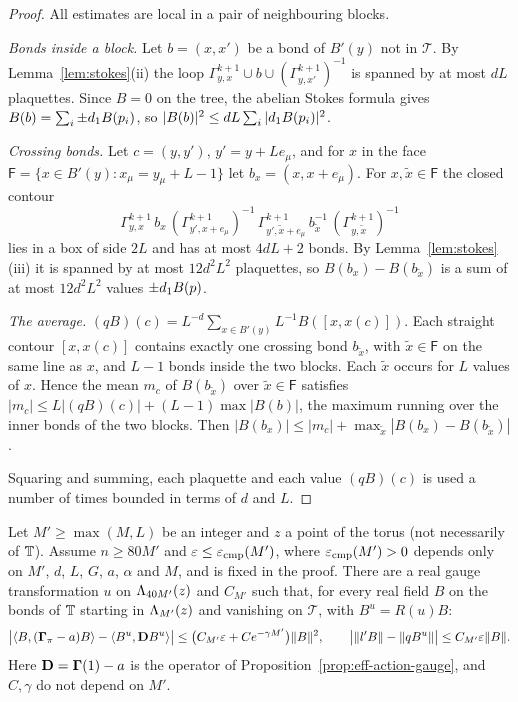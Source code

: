 \begin{proof}
All estimates are local in a pair of neighbouring blocks.

\emph{Bonds inside a block.} Let $b=(x,x')$ be a bond of $B'(y)$ not in $\mathcal T$. By Lemma~\ref{lem:stokes}(ii) the loop $\Gamma^{k+1}_{y,x}\cup b\cup(\Gamma^{k+1}_{y,x'})^{-1}$ is spanned by at most $dL$ plaquettes. Since $B=0$ on the tree, the abelian Stokes formula gives $B(b)=\sum_i\pm d_1 B(p_i)$, so $|B(b)|^2\le dL\sum_i|d_1 B(p_i)|^2$.

\emph{Crossing bonds.} Let $c=(y,y')$, $y'=y+Le_\mu$, and for $x$ in the face $\mathsf F=\{x\in B'(y):x_\mu=y_\mu+L-1\}$ let $b_x=(x,x+e_\mu)$. For $x,\tilde x\in\mathsf F$ the closed contour
\[
\Gamma^{k+1}_{y,x}\,b_x\,(\Gamma^{k+1}_{y',x+e_\mu})^{-1}\,\Gamma^{k+1}_{y',\tilde x+e_\mu}\,b_{\tilde x}^{-1}\,(\Gamma^{k+1}_{y,\tilde x})^{-1}
\]
lies in a box of side $2L$ and has at most $4dL+2$ bonds. By Lemma~\ref{lem:stokes}(iii) it is spanned by at most $12d^2L^2$ plaquettes, so $B(b_x)-B(b_{\tilde x})$ is a sum of at most $12d^2L^2$ values $\pm d_1 B(p)$.

\emph{The average.} $(qB)(c)=L^{-d}\sum_{x\in B'(y)}L^{-1}B([x,x(c)])$. Each straight contour $[x,x(c)]$ contains exactly one crossing bond $b_{\tilde x}$, with $\tilde x\in\mathsf F$ on the same line as $x$, and $L-1$ bonds inside the two blocks. Each $\tilde x$ occurs for $L$ values of $x$. Hence the mean $m_c$ of $B(b_{\tilde x})$ over $\tilde x\in\mathsf F$ satisfies $|m_c|\le L|(qB)(c)|+(L-1)\max|B(b)|$, the maximum running over the inner bonds of the two blocks. Then $|B(b_x)|\le|m_c|+\max_{\tilde x}|B(b_x)-B(b_{\tilde x})|$.

Squaring and summing, each plaquette and each value $(qB)(c)$ is used a number of times bounded in terms of $d$ and $L$.
\end{proof}

\begin{lemma}\label{lem:local-comparison}
Let $M'\ge\max(M,L)$ be an integer and $z$ a point of the torus (not necessarily of $\mathbb T$). Assume $n\ge80M'$ and $\varepsilon\le\varepsilon_{\rm cmp}(M')$, where $\varepsilon_{\rm cmp}(M')>0$ depends only on $M'$, $d$, $L$, $G$, $a$, $\alpha$ and $M$, and is fixed in the proof. There are a real gauge transformation $u$ on $\Lambda_{40M'}(z)$ and $C_{M'}$ such that, for every real field $B$ on the bonds of $\mathbb T$ starting in $\Lambda_{M'}(z)$ and vanishing on $\mathcal T$, with $B^u=R(u)B$:
\[
\big|\langle B,(\boldsymbol\Gamma_\pi-a)B\rangle-\langle B^u,\mathbf D B^u\rangle\big|\le\big(C_{M'}\varepsilon+Ce^{-\gamma M'}\big)\|B\|^2,\qquad\big|\|l'B\|-\|qB^u\|\big|\le C_{M'}\varepsilon\|B\| .
\]
Here $\mathbf D=\boldsymbol\Gamma(1)-a$ is the operator of Proposition~\ref{prop:eff-action-gauge}, and $C,\gamma$ do not depend on $M'$.
\end{lemma}

